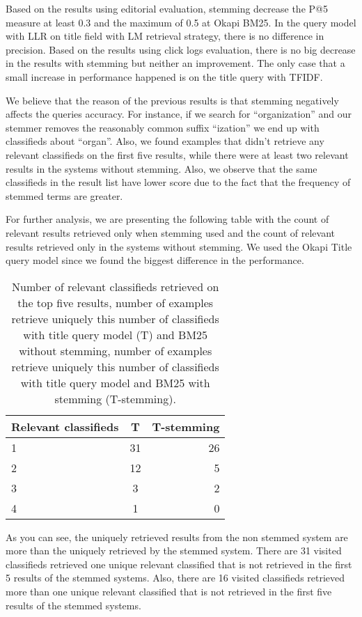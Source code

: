 Based on the results using editorial evaluation, stemming decrease the P@5 measure at least 0.3 and the maximum of 0.5 at Okapi BM25. In the query model with LLR on title field with LM retrieval strategy, there is no difference in precision.
Based on the results using click logs evaluation, there is no big decrease in the results with stemming but neither an improvement. The only case that a small increase in performance happened is on the title query with TFIDF.

We believe that the reason of the previous results is that stemming negatively affects the queries accuracy. For instance, if we search for ``organization'' and our stemmer removes the reasonably common suffix ``ization'' we end up with classifieds about ``organ''. Also, we found examples that didn't retrieve any relevant classifieds on the first five results, while there were at least two relevant results in the systems without stemming. Also, we observe that the same classifieds in the result list have lower score due to the fact that the frequency of stemmed terms are greater.

For further analysis, we are presenting the following table with the count of relevant results retrieved only when stemming used and the count of relevant results retrieved only in the systems without stemming. We used the Okapi Title query model since we found the biggest difference in the performance.

\begin{table}[h]
\begin{center}
\caption{Number of relevant classifieds retrieved on the top five results, number of examples retrieve uniquely this number of classifieds with title query model (T) and BM25 without stemming, number of examples retrieve uniquely this number of classifieds with title query model and BM25 with stemming (T-stemming).}
\begin{tabular}{lcr}
\midrule
Relevant classifieds & T & T-stemming \\
\midrule
	1 & 31 & 26 \\
	2 & 12 & 5  \\
	3 & 3 & 2 \\
	4 & 1 & 0  \\
\bottomrule
\end{tabular}
\end{center}
\end{table}


As you can see, the uniquely retrieved results from the non stemmed system are more than the uniquely retrieved by the stemmed system. There are 31 visited classifieds retrieved one unique relevant classified that is not retrieved in the first 5 results of the stemmed systems. Also, there are 16 visited classifieds retrieved more than one unique relevant classified that is not retrieved in the first five results of the stemmed systems.

